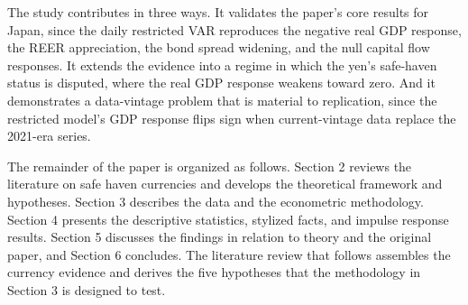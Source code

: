 The study contributes in three ways. It validates the paper's core results for Japan, since the daily restricted VAR reproduces the negative real GDP response, the REER appreciation, the bond spread widening, and the null capital flow responses. It extends the evidence into a regime in which the yen's safe-haven status is disputed, where the real GDP response weakens toward zero. And it demonstrates a data-vintage problem that is material to replication, since the restricted model's GDP response flips sign when current-vintage data replace the 2021-era series.

The remainder of the paper is organized as follows. Section 2 reviews the literature on safe haven currencies and develops the theoretical framework and hypotheses. Section 3 describes the data and the econometric methodology. Section 4 presents the descriptive statistics, stylized facts, and impulse response results. Section 5 discusses the findings in relation to theory and the original paper, and Section 6 concludes. The literature review that follows assembles the currency evidence and derives the five hypotheses that the methodology in Section 3 is designed to test.
